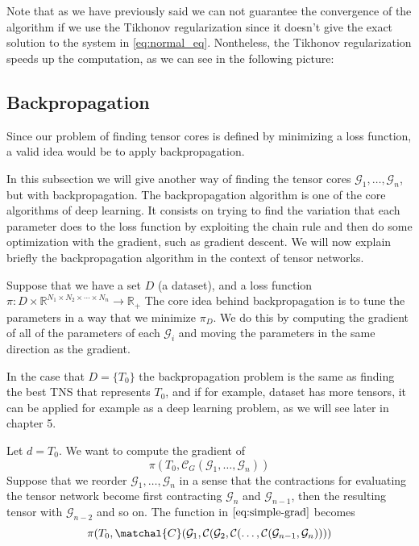 \documentclass[11pt,a4paper,openright,oneside]{book}
\numberwithin{equation}{section}
\newcommand{\refeq}[1]{\cref{#1}}
\begin{document}
{Note that as we have previously said we can not guarantee the convergence of the algorithm if we use the Tikhonov regularization since it doesn't give
the exact solution to the system in \refeq{eq:normal_eq}. Nontheless, the Tikhonov regularization speeds up the 
computation, as we can see in the following picture:

\begin{figure}[H]

    \caption{}
    \label{fig:als-convergence-tiknov}
\end{figure}


\subsection{Backpropagation}

Since our problem of finding tensor cores is defined by minimizing a loss function, a valid idea would be
to apply backpropagation.

In this subsection we will give another way of finding the tensor cores $\mathcal{G}_1, \dots, \mathcal{G}_n$, but with 
backpropagation. The backpropagation algorithm is one of the core algorithms of deep learning. It consists on
trying to find the variation that each parameter does to the loss function by exploiting the chain rule and
then do some optimization with the gradient, such as gradient descent. We will now explain briefly the backpropagation
algorithm in the context of tensor networks.


Suppose that we have a set $D$ (a dataset), and a loss function ${\pi: D \times \mathbb{R}^{N_1 \times N_2 \times \cdots \times N_n} \rightarrow \mathbb{R}_+}$
The core idea behind backpropagation is to tune the parameters in a way that
we minimize $\pi_D$. We do this by computing the gradient of all of the parameters of each $\mathcal{G}_i$ and moving 
the parameters in the same direction as the gradient.

In the case that $D = \{T_0\}$ the backpropagation problem is the same as finding the best TNS that represents $T_0$, and if
for example, dataset has more tensors, it can be applied for example as a deep learning problem, as we will see later in chapter 5.

Let $d = T_0$. We want to compute the gradient of
\begin{equation}
\pi(T_0, \mathcal{C}_G(\mathcal{G}_1, \dots, \mathcal{G}_n))
\label{eq:simple-grad}
\end{equation}
Suppose that we reorder $\mathcal{G}_1, \dots, \mathcal{G}_n$ in a sense that the contractions for evaluating the tensor
network become first contracting $\mathcal{G}_n$ and $\mathcal{G}_{n-1}$, then the resulting tensor with $\mathcal{G}_{n-2}$
and so on. The function in $\ref{eq:simple-grad}$ becomes
\begin{equation}
    \pi(T_0, \matchal{C}(\mathcal{G}_1, \mathcal{C}( \mathcal{G}_2, \mathcal{C}(\dots, \mathcal{C}(\mathcal{G}_{n-1}, \mathcal{G}_n))))
    \label{eq:extended-grad}
\end{equation}

}
\end{document}
